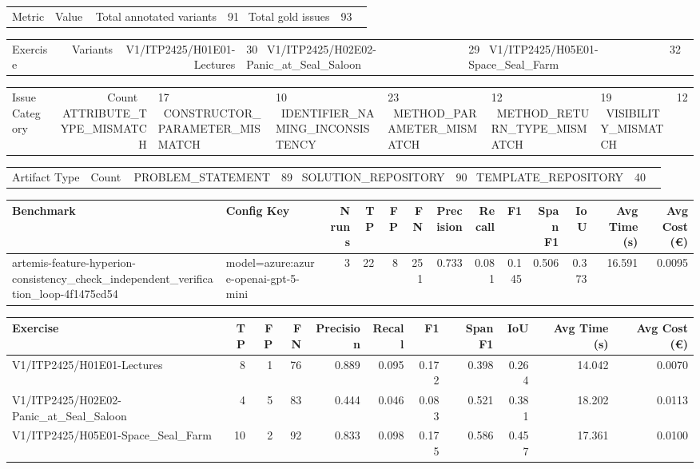 \begin{tabular}{lr}
Metric & Value \
\hline
Total annotated variants & 91 \
Total gold issues & 93 \
\end{tabular}

\begin{tabular}{lr}
Exercise & Variants \
\hline
V1/ITP2425/H01E01-Lectures & 30 \
V1/ITP2425/H02E02-Panic\_at\_Seal\_Saloon & 29 \
V1/ITP2425/H05E01-Space\_Seal\_Farm & 32 \
\end{tabular}

\begin{tabular}{lr}
Issue Category & Count \
\hline
ATTRIBUTE\_TYPE\_MISMATCH & 17 \
CONSTRUCTOR\_PARAMETER\_MISMATCH & 10 \
IDENTIFIER\_NAMING\_INCONSISTENCY & 23 \
METHOD\_PARAMETER\_MISMATCH & 12 \
METHOD\_RETURN\_TYPE\_MISMATCH & 19 \
VISIBILITY\_MISMATCH & 12 \
\end{tabular}

\begin{tabular}{lr}
Artifact Type & Count \
\hline
PROBLEM\_STATEMENT & 89 \
SOLUTION\_REPOSITORY & 90 \
TEMPLATE\_REPOSITORY & 40 \
\end{tabular}

\begin{tabular}{llrrrrrrrrrrr}
Benchmark & Config Key & N runs & TP & FP & FN & Precision & Recall & F1 & Span F1 & IoU & Avg Time (s) & Avg Cost (€) \\
\hline
artemis-feature-hyperion-consistency\_check\_independent\_verification\_loop-4f1475cd54 & model=azure:azure-openai-gpt-5-mini & 3 & 22 & 8 & 251 & 0.733 & 0.081 & 0.145 & 0.506 & 0.373 & 16.591 & 0.0095 \\
\end{tabular}

\begin{tabular}{lrrrrrrrrrr}
Exercise & TP & FP & FN & Precision & Recall & F1 & Span F1 & IoU & Avg Time (s) & Avg Cost (€) \\
\hline
V1/ITP2425/H01E01-Lectures & 8 & 1 & 76 & 0.889 & 0.095 & 0.172 & 0.398 & 0.264 & 14.042 & 0.0070 \\
V1/ITP2425/H02E02-Panic\_at\_Seal\_Saloon & 4 & 5 & 83 & 0.444 & 0.046 & 0.083 & 0.521 & 0.381 & 18.202 & 0.0113 \\
V1/ITP2425/H05E01-Space\_Seal\_Farm & 10 & 2 & 92 & 0.833 & 0.098 & 0.175 & 0.586 & 0.457 & 17.361 & 0.0100 \\
\end{tabular}
